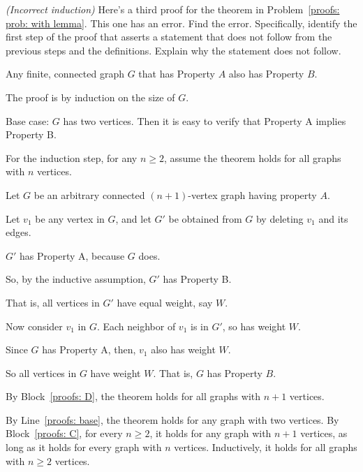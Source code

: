 \exercise\label{proofs: exercise: bad graph induction}\emph{(Incorrect induction)}
Here's a third proof for the theorem in Problem~\ref{proofs: prob: with lemma}.
This one has an error.  Find the error.
Specifically, identify the first step of the proof that asserts a statement
that does not follow from the previous steps and the definitions.
Explain why the statement does not follow.

\addtocounter{theorem}{-1}
\begin{restatement}
\begin{theorem}
  Any finite, connected graph $G$ that has Property $A$ also has Property $B$.
\end{theorem}
\end{restatement}
\begin{longFormProof}
  \step The proof is by induction on the size of $G$.

   Base case: $G$ has two vertices.  Then it is easy to verify that Property A implies Property B.

  \begin{block}[proofs: C]
    \step For the induction step, for any $n\ge 2$,
    assume the theorem holds for all graphs with $n$ vertices.

    \begin{block}[proofs: D]
      \step Let $G$ be an arbitrary connected $(n+1)$-vertex graph having property $A$.

      \step Let $v_1$ be any vertex in $G$, and let $G'$ be obtained from $G$ by deleting $v_1$ and its edges.

       $G'$ has Property A, because $G$ does.
      
      \step So, by the inductive assumption, $G'$ has Property B.

      \step That is, all vertices in $G'$ have equal weight, say $W$.
      
      \step Now consider $v_1$ in $G$.  Each neighbor of $v_1$ is in $G'$, so has weight $W$.

      \step Since $G$ has Property A, then, $v_1$ also has weight $W$.

      \step So all vertices in $G$ have weight $W$.  That is, $G$ has Property $B$.
    \end{block}
    \step By Block~\ref{proofs: D}, the theorem holds for all graphs with $n+1$ vertices.
  \end{block}
  \step By Line~\ref{proofs: base}, the theorem holds for any graph with two vertices.
  By Block~\ref{proofs: C}, for every $n\ge 2$,
  it holds for any graph with $n+1$ vertices,
  as long as it holds for every graph with $n$ vertices.
  Inductively, it holds for all graphs with $n\ge 2$ vertices.
\end{longFormProof}

